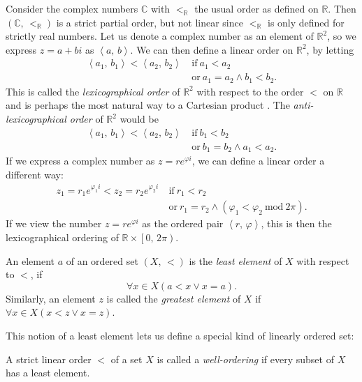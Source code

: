 \documentclass[../../main.tex]{subfiles}
\begin{document}
\begin{example}
    Consider the complex numbers $\mathbb{C}$ with $<_{\mathbb{R}}$ the usual order as defined on $\mathbb{R}$.
    Then $(\mathbb{C},\, <_{\mathbb{R}})$ is a strict partial order, but not linear since $<_{\mathbb{R}}$ is only defined for strictly real numbers.
    Let us denote a complex number as an element of $\mathbb{R}^2$, so we express $z = a + b i$ as $\left<a,\, b\right>$.
    We can then define a linear order on $\mathbb{R}^2$, by letting 
    \begin{align*}
        \left<a_1,\, b_1\right> < \left<a_2,\, b_2\right>\ &\text{if}\ a_1 < a_2 \\
        &\text{or}\ a_1 = a_2 \wedge b_1 < b_2.
    \end{align*}
    This is called the \textit{lexicographical order} of $\mathbb{R}^2$ with respect to the order $<$ on $\mathbb{R}$ and is perhaps the most natural way to a Cartesian product \cite[p.182]{Gol17}.
    The \textit{anti-lexicographical order} of $\mathbb{R}^2$ would be 
    \begin{align*}
        \left<a_1,\, b_1\right> < \left<a_2,\, b_2\right>\ &\text{if}\ b_1 < b_2 \\
        &\text{or}\ b_1 = b_2 \wedge a_1 < a_2.
    \end{align*}
    If we express a complex number as $z = r e^{\varphi i}$, we can define a linear order a different way:
    \begin{align*}
        z_1 = r_1 e^{\varphi_1 i} < z_2 = r_2 e^{\varphi_2 i}\ &\text{if}\ r_1 < r_2 \\
        &\text{or}\ r_1 = r_2 \wedge (\varphi_1 < \varphi_2\ \text{mod}\ 2\pi).
    \end{align*}
    If we view the number $z = r e^{\varphi i}$ as the ordered pair $\left<r,\, \varphi\right>$, this is then the lexicographical ordering of $\mathbb{R} \times \left[0,\, 2 \pi\right)$.
\end{example}

\begin{definition}\cite[p.12]{Jec78}
    An element $a$ of an ordered set $\left(X,\, <\right)$ is the \textit{least element} of $X$ with respect to $<$, if $$\forall x \in X  \left(a < x \vee x = a\right).$$
    Similarly, an element $z$ is called the \textit{greatest element} of $X$ if $\forall x \in X  \left(x < z \vee x = z\right)$.
\end{definition}

This notion of a least element lets us define a special kind of linearly ordered set:
\begin{definition}\cite[p.13]{Jec78}
    A strict linear order $<$ of a set $X$ is called a \textit{well-ordering} if every subset of $X$ has a least element.
\end{definition}
\end{document}
